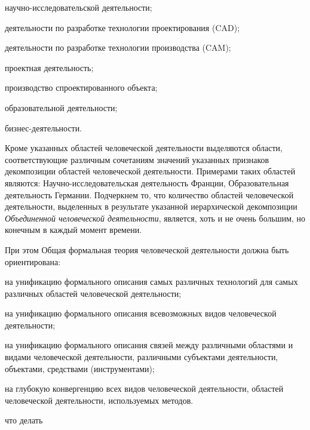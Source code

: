 \begin{scnsubstruct}
{\begin{scnitemize}
            \begin{scnitemizeii}
                \item научно-исследовательской деятельности;
                \item деятельности по разработке технологии проектирования (CAD);
                \item деятельности по разработке технологии производства (CAM);
                \item проектная деятельность;
                \item производство спроектированного объекта;
                \item образовательной деятельности;
                \item бизнес-деятельности.
            \end{scnitemizeii}
            Кроме указанных областей человеческой деятельности выделяются области, соответствующие различным сочетаниям значений указанных признаков декомпозиции областей человеческой деятельности. Примерами таких областей являются: Научно-исследовательская деятельность Франции, Образовательная деятельность Германии. Подчеркнем то, что количество областей человеческой деятельности, выделенных в результате указанной иерархической декомпозиции \textit{Объединенной человеческой деятельности}, является, хоть и не очень большим, но конечным в каждый момент времени.
        \end{scnitemize}
        \bigskip
        При этом Общая формальная теория человеческой деятельности должна быть ориентирована:
        \begin{scnitemize}
            \item на унификацию формального описания самых различных технологий для самых различных областей человеческой деятельности;
            \item на унификацию формального описания всевозможных видов человеческой деятельности;
            \item на унификацию формального описания связей между различными областями и видами человеческой деятельности, различными субъектами деятельности, объектами, средствами (инструментами);
            \item на глубокую конвергенцию всех видов человеческой деятельности, областей человеческой деятельности, используемых методов.
        \end{scnitemize}}
    \begin{scnrelfromvector}{что делать}

\end{scnrelfromvector}
\end{scnsubstruct}
